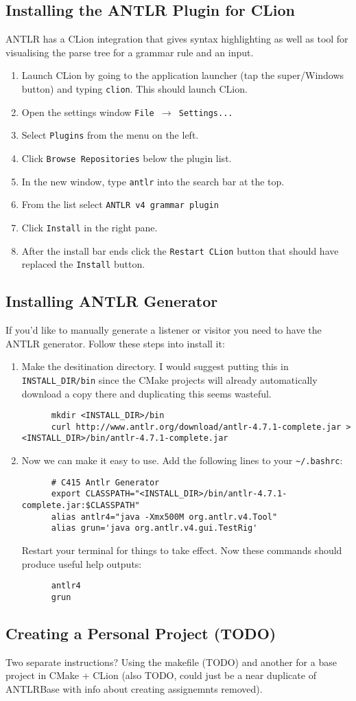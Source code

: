 \documentclass[../setup.tex]{subfiles}
\begin{document}
\subsection{Installing the ANTLR Plugin for CLion}
ANTLR has a CLion integration that gives syntax highlighting as well as tool for visualising the
parse tree for a grammar rule and an input.
\begin{enumerate}
  \item
    Launch CLion by going to the application launcher (tap the super/Windows button) and typing
    \lstinline{clion}. This should launch CLion.
  \item
    Open the settings window \texttt{File $\rightarrow$ Settings...}
  \item
    Select \texttt{Plugins} from the menu on the left.
  \item
    Click \texttt{Browse Repositories} below the plugin list.
  \item
    In the new window, type \texttt{antlr} into the search bar at the top.
  \item
    From the list select \lstinline{ANTLR v4 grammar plugin}
  \item
    Click \texttt{Install} in the right pane.
  \item
    After the install bar ends click the \texttt{Restart CLion} button that should have replaced
    the \texttt{Install} button.
\end{enumerate}

\subsection{Installing ANTLR Generator}
If you'd like to manually generate a listener or visitor you need to have the ANTLR generator.
Follow these steps into install it:
\begin{enumerate}
  \item
    Make the desitination directory. I would suggest putting this in \lstinline{INSTALL_DIR/bin}
    since the CMake projects will already automatically download a copy there and duplicating
    this seems wasteful.
    \begin{lstlisting}
      mkdir <INSTALL_DIR>/bin
      curl http://www.antlr.org/download/antlr-4.7.1-complete.jar > <INSTALL_DIR>/bin/antlr-4.7.1-complete.jar
    \end{lstlisting}
  \item
    Now we can make it easy to use. Add the following lines to your \lstinline{~/.bashrc}:
    \begin{lstlisting}
      # C415 Antlr Generator
      export CLASSPATH="<INSTALL_DIR>/bin/antlr-4.7.1-complete.jar:$CLASSPATH"
      alias antlr4="java -Xmx500M org.antlr.v4.Tool"
      alias grun='java org.antlr.v4.gui.TestRig'
    \end{lstlisting}
    Restart your terminal for things to take effect. Now these commands should produce useful help
    outputs:
    \begin{lstlisting}
      antlr4
      grun
    \end{lstlisting}
\end{enumerate}

\subsection{Creating a Personal Project (TODO)}
Two separate instructions? Using the makefile (TODO) and another for a base project in CMake +
CLion (also TODO, could just be a near duplicate of ANTLRBase with info about creating assignemnts
removed).
\end{document}
